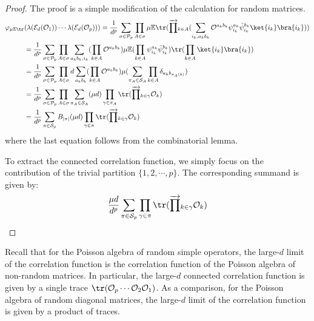 \documentclass[a4paper,11pt]{article}
\theoremstyle{definition}
\numberwithin{equation}{section}
\begin{document}
\begin{proof}
    The proof is a simple modification of the calculation for random matrices. 
    \begin{align}
        \begin{split}
            \varphi_{\mu\mathbb{E}\tr}&(\lambda(\mathcal{E}_d(\mathcal{O}_1))\cdots\lambda(\mathcal{E}_d(\mathcal{O}_p))) = \frac{1}{d^p}\sum_{\sigma\in\mathcal{P}_p}\prod_{A\in\sigma}\mu\mathbb{E}\tr(\overrightarrow{\prod}_{k\in A}(\sum_{i_k,a_kb_k}\mathcal{O}^{a_kb_k}\psi^{a_k}_{i_k}\bar{\psi}^{b_k}_{i_k}\ket{i_k}\bra{i_k}))
            \\
            &=\frac{1}{d^p}\sum_{\sigma\in\mathcal{P}_p}\prod_{A\in\sigma}\sum_{a_kb_k,i_k}(\prod_{k\in A}\mathcal{O}^{a_kb_k})\mu\mathbb{E}(\prod_{k\in A}\psi^{a_k}_{i_k}\bar{\psi}^{b_k}_{i_k})\tr(\prod_{k\in A}\ket{i_k}\bra{i_k})
            \\
            &=\frac{1}{d^p}\sum_{\sigma\in\mathcal{P}_p}\prod_{A\in\sigma}d\sum_{a_kb_k}(\prod_{k\in A}\mathcal{O}^{a_kb_k})\mu(\sum_{\pi_A\in\mathcal{S}_A}\prod_{k\in A}\delta_{a_kb_{\pi_A(k)}})
            \\&
            =\frac{1}{d^p}\sum_{\sigma\in\mathcal{P}_p}\prod_{A\in\sigma}\sum_{\pi_A\in\mathcal{S}_A}(\mu d)\prod_{\gamma\in\pi_A}\tr(\overrightarrow{\prod}_{k\in \gamma}\mathcal{O}_k)
            \\
            &=\frac{1}{d^p}\sum_{\pi\in\mathcal{S}_p}B_{|\pi|}(\mu d)\prod_{\gamma\in\pi}\tr(\overrightarrow{\prod}_{k\in\gamma}\mathcal{O}_k)
        \end{split}
    \end{align}
    where the last equation follows from the combinatorial lemma.

    To extract the connected correlation function, we simply focus on the contribution of the trivial partition $\{1,2,\cdots,p\}$. The corresponding summand is given by:
    \begin{equation}
        \frac{\mu d}{d^p}\sum_{\pi\in\mathcal{S}_p}\prod_{\gamma\in\pi}\tr(\overrightarrow{\prod}_{k\in\gamma}\mathcal{O}_k)\qedhere
    \end{equation}
\end{proof}
Recall that for the Poisson algebra of random simple operators, the large-$d$ limit of the correlation function is the correlation function of the Poisson algebra of non-random matrices. In particular, the large-$d$ connected correlation function is given by a single trace $\tr(\mathcal{O}_p\cdots\mathcal{O}_2\mathcal{O}_1)$. As a comparison, for the Poisson algebra of random diagonal matrices, the large-$d$ limit of the correlation function is given by a product of traces.
\end{document}
